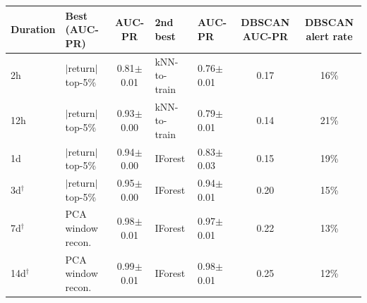 \begin{tabular}{llcllcc}
\toprule
Duration & Best (AUC-PR) & AUC-PR & 2nd best & AUC-PR & DBSCAN AUC-PR & DBSCAN alert rate \\
\midrule
2h & $|$return$|$ top-5\% & 0.81$\pm$0.01 & kNN-to-train & 0.76$\pm$0.01 & 0.17 & 16\% \\
12h & $|$return$|$ top-5\% & 0.93$\pm$0.00 & kNN-to-train & 0.79$\pm$0.01 & 0.14 & 21\% \\
1d & $|$return$|$ top-5\% & 0.94$\pm$0.00 & IForest & 0.83$\pm$0.03 & 0.15 & 19\% \\
3d$^\dagger$ & $|$return$|$ top-5\% & 0.95$\pm$0.00 & IForest & 0.94$\pm$0.01 & 0.20 & 15\% \\
7d$^\dagger$ & PCA window recon. & 0.98$\pm$0.01 & IForest & 0.97$\pm$0.01 & 0.22 & 13\% \\
14d$^\dagger$ & PCA window recon. & 0.99$\pm$0.01 & IForest & 0.98$\pm$0.01 & 0.25 & 12\% \\
\bottomrule
\end{tabular}
